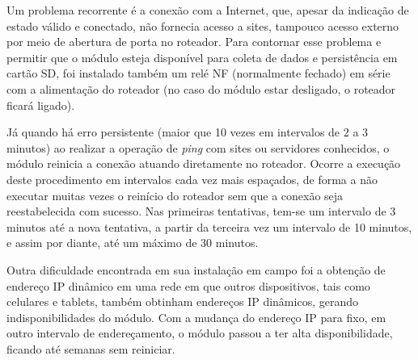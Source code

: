 Um problema recorrente é a conexão com a Internet, que, apesar da indicação de estado válido e conectado, não fornecia acesso a sites, tampouco acesso externo por meio de abertura de porta no roteador. Para contornar esse problema e permitir que o módulo esteja disponível para coleta de dados e persistência em cartão SD, foi instalado também um relé NF (normalmente fechado) em série com a alimentação do roteador (no caso do módulo estar desligado, o roteador ficará ligado).

Já quando há erro persistente (maior que 10 vezes em intervalos de 2 a 3 minutos) ao realizar a operação de \emph{ping} com sites ou servidores conhecidos, o módulo reinicia a conexão atuando diretamente no roteador. Ocorre a execução deste procedimento em intervalos cada vez mais espaçados, de forma a não executar muitas vezes o reinício do roteador sem que a conexão seja reestabelecida com sucesso. Nas primeiras tentativas, tem-se um intervalo de 3 minutos até a nova tentativa, a partir da terceira vez um intervalo de 10 minutos, e assim por diante, até um máximo de 30 minutos.

Outra dificuldade encontrada em sua instalação em campo foi a obtenção de endereço IP dinâmico em uma rede em que outros dispositivos, tais como celulares e tablets, também obtinham endereços IP dinâmicos, gerando indisponibilidades do módulo. Com a mudança do endereço IP para fixo, em outro intervalo de endereçamento, o módulo passou a ter alta disponibilidade, ficando até semanas sem reiniciar.
